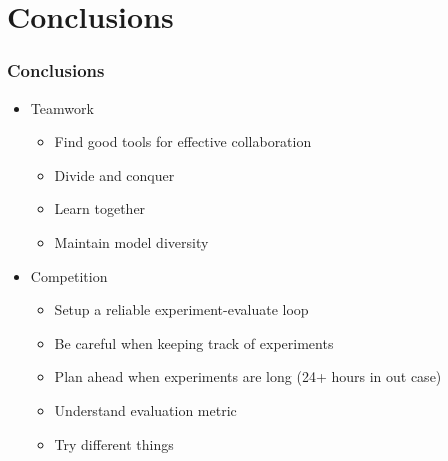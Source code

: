 \section{Conclusions}
\begin{frame}\frametitle{Conclusions}
\begin{itemize}

\item Teamwork
\begin{itemize}
\item Find good tools for effective collaboration
\item Divide and conquer
\item Learn together
\item Maintain model diversity
\end{itemize}

\item Competition
\begin{itemize}
\item Setup a reliable experiment-evaluate loop
\item Be careful when keeping track of experiments
\item Plan ahead when experiments are long (24+ hours in out case)
\item Understand evaluation metric
\item Try different things
\end{itemize}

\end{itemize}
\end{frame}